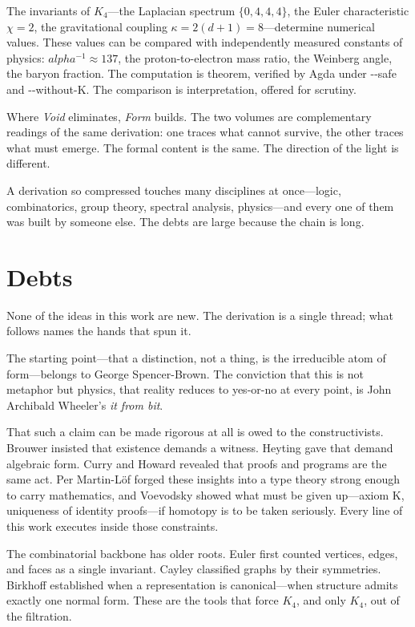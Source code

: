 \documentclass[11pt,a4paper]{book}
\newcommand{\AgdaFlag}[1]{\texttt{-{}-#1}}
\def\alpha{alpha}%
\def\texttt#1{#1}%
\begin{document}
The invariants of $K_4$—the Laplacian spectrum $\{0,4,4,4\}$, the Euler characteristic $\chi = 2$, the gravitational coupling $\kappa = 2(d+1) = 8$—determine numerical values. These values can be compared with independently measured constants of physics: $\alpha^{-1} \approx 137$, the proton-to-electron mass ratio, the Weinberg angle, the baryon fraction. The computation is theorem, verified by Agda under \AgdaFlag{safe} and \AgdaFlag{without-K}. The comparison is interpretation, offered for scrutiny.

Where \textit{Void} eliminates, \textit{Form} builds. The two volumes are complementary readings of the same derivation: one traces what cannot survive, the other traces what must emerge. The formal content is the same. The direction of the light is different.

A derivation so compressed touches many disciplines at once---logic, combinatorics, group theory, spectral analysis, physics---and every one of them was built by someone else. The debts are large because the chain is long.

\section*{Debts}

None of the ideas in this work are new. The derivation is a single thread; what follows names the hands that spun it.

The starting point---that a distinction, not a thing, is the irreducible atom of form---belongs to George Spencer-Brown. The conviction that this is not metaphor but physics, that reality reduces to yes-or-no at every point, is John Archibald Wheeler's \textit{it from bit}.

That such a claim can be made rigorous at all is owed to the constructivists. Brouwer insisted that existence demands a witness. Heyting gave that demand algebraic form. Curry and Howard revealed that proofs and programs are the same act. Per Martin-L\"of forged these insights into a type theory strong enough to carry mathematics, and Voevodsky showed what must be given up---axiom K, uniqueness of identity proofs---if homotopy is to be taken seriously. Every line of this work executes inside those constraints.

The combinatorial backbone has older roots. Euler first counted vertices, edges, and faces as a single invariant. Cayley classified graphs by their symmetries. Birkhoff established when a representation is canonical---when structure admits exactly one normal form. These are the tools that force $K_4$, and only $K_4$, out of the filtration.
\end{document}

